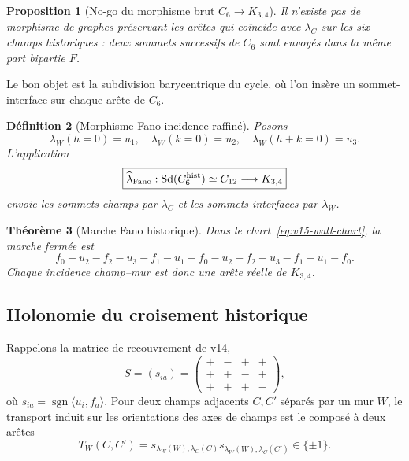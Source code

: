 \documentclass[11pt,a4paper]{article}
\newtheorem{theorem}{Théorème}[section]
\newtheorem{proposition}[theorem]{Proposition}
\newtheorem{definition}[theorem]{Définition}
\begin{document}
\begin{proposition}[No-go du morphisme brut $C_6\to K_{3,4}$]\label{prop:v15-raw-map-nogo}
Il n'existe pas de morphisme de graphes préservant les arêtes qui coïncide avec $\lambda_C$ sur les six champs historiques : deux sommets successifs de $C_6$ sont envoyés dans la même part bipartie $F$.
\end{proposition}

Le bon objet est la subdivision barycentrique du cycle, où l'on insère un sommet-interface sur chaque arête de $C_6$.

\begin{definition}[Morphisme Fano incidence-raffiné]\label{def:v15-refined-map}
Posons
\[
 \lambda_W(h=0)=u_1,
 \quad
 \lambda_W(k=0)=u_2,
 \quad
 \lambda_W(h+k=0)=u_3.
\]
L'application
\begin{equation}\label{eq:v15-refined-map}
 \boxed{
 \widehat\lambda_{\rm Fano}:
 \operatorname{Sd}(C_6^{\rm hist})\simeq C_{12}
 \longrightarrow K_{3,4}}
\end{equation}
envoie les sommets-champs par $\lambda_C$ et les sommets-interfaces par $\lambda_W$.
\end{definition}

\begin{theorem}[Marche Fano historique]\label{thm:v15-historical-walk}
Dans le chart~\eqref{eq:v15-wall-chart}, la marche fermée est
\begin{equation}\label{eq:v15-walk}
 \boxed{
 f_0-u_2-f_2-u_3-f_1-u_1-
 f_0-u_2-f_2-u_3-f_1-u_1-f_0.}
\end{equation}
Chaque incidence champ--mur est donc une arête réelle de $K_{3,4}$.
\end{theorem}

\subsection{Holonomie du croisement historique}

Rappelons la matrice de recouvrement de v14,
\[
 S=(s_{ia})=
 \begin{pmatrix}
 +&-&+&+\\
 +&+&-&+\\
 +&+&+&-
 \end{pmatrix},
\]
où $s_{ia}=\operatorname{sgn}\langle u_i,f_a\rangle$.
Pour deux champs adjacents $C,C'$ séparés par un mur $W$, le transport induit sur les orientations des axes de champs est le composé à deux arêtes
\begin{equation}\label{eq:v15-induced-edge-transport}
 T_W(C,C')
 =s_{\lambda_W(W),\lambda_C(C)}
  s_{\lambda_W(W),\lambda_C(C')}
 \in\{\pm1\}.
\end{equation}
\end{document}
